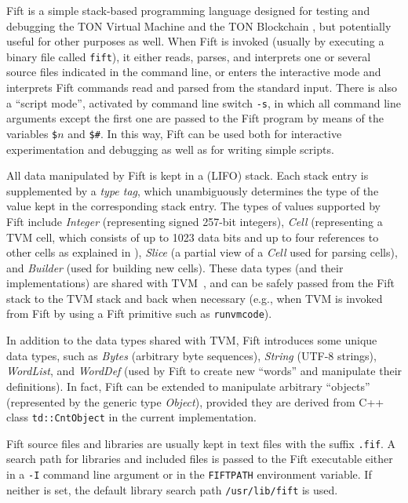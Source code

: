 \documentclass[12pt,oneside]{article}
\begin{document}
Fift is a simple stack-based programming language designed for testing and debugging the TON Virtual Machine \cite{TVM} and the TON Blockchain \cite{TBC}, but potentially useful for other purposes as well. When Fift is invoked (usually by executing a binary file called {\tt fift}), it either reads, parses, and interprets one or several source files indicated in the command line, or enters the interactive mode and interprets Fift commands read and parsed from the standard input. There is also a ``script mode'', activated by command line switch {\tt -s}, in which all command line arguments except the first one are passed to the Fift program by means of the variables {\tt \$$n$} and {\tt \$\#}. In this way, Fift can be used both for interactive experimentation and debugging as well as for writing simple scripts.

All data manipulated by Fift is kept in a (LIFO) stack. Each stack entry is supplemented by a {\em type tag}, which unambiguously determines the type of the value kept in the corresponding stack entry. The types of values supported by Fift include {\em Integer\/} (representing signed 257-bit integers), {\em Cell\/} (representing a TVM cell, which consists of up to 1023 data bits and up to four references to other cells as explained in \cite{TVM}), {\em Slice\/} (a partial view of a {\em Cell\/} used for parsing cells), and {\em Builder\/} (used for building new cells). These data types (and their implementations) are shared with TVM~\cite{TVM}, and can be safely passed from the Fift stack to the TVM stack and back when necessary (e.g., when TVM is invoked from Fift by using a Fift primitive such as {\tt runvmcode}).

In addition to the data types shared with TVM, Fift introduces some unique data types, such as {\em Bytes\/} (arbitrary byte sequences), {\em String\/} (UTF-8 strings), {\em WordList\/}, and {\em WordDef\/} (used by Fift to create new ``words'' and manipulate their definitions). In fact, Fift can be extended to manipulate arbitrary ``objects'' (represented by the generic type {\em Object}), provided they are derived from C++ class {\tt td::CntObject} in the current implementation.

Fift source files and libraries are usually kept in text files with the suffix {\tt .fif}. A search path for libraries and included files is passed to the Fift executable either in a {\tt -I} command line argument or in the {\tt FIFTPATH} environment variable. If neither is set, the default library search path {\tt /usr/lib/fift} is used.
\end{document}
